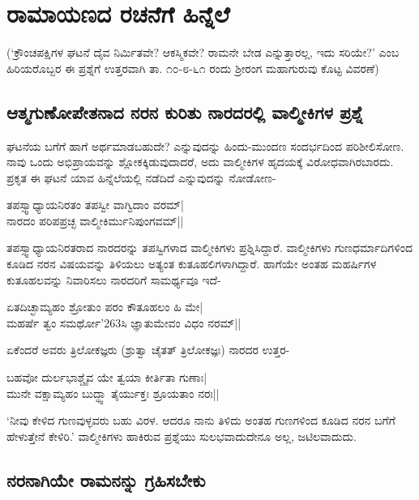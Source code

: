 \chapter{ರಾಮಾಯಣದ ರಚನೆಗೆ ಹಿನ್ನೆಲೆ} 

(`ಕ್ರೌಂಚಪಕ್ಷಿಗಳ ಘಟನೆ ದೈವ ನಿರ್ಮಿತವೇ? ಆಕಸ್ಮಿಕವೇ? ರಾಮನೇ ಬೇಡ ಎನ್ನುತ್ತಾರಲ್ಲ, ಇದು ಸರಿಯೇ?' ಎಂಬ ಹಿರಿಯರೊಬ್ಬರ ಈ ಪ್ರಶ್ನೆಗೆ ಉತ್ತರವಾಗಿ ತಾ. ೧೦-೮-೬೧ ರಂದು ಶ್ರೀರಂಗ ಮಹಾಗುರುವು ಕೊಟ್ಟ ವಿವರಣೆ) 

\section*{ಆತ್ಮಗುಣೋಪೇತನಾದ ನರನ ಕುರಿತು ನಾರದರಲ್ಲಿ ವಾಲ್ಮೀಕಿಗಳ ಪ್ರಶ್ನೆ} 

ಘಟನೆಯ ಬಗೆಗೆ ಹಾಗೆ ಅರ್ಥಮಾಡಬಹುದೇ? ಎನ್ನುವುದನ್ನು ಹಿಂದು-ಮುಂದಣ ಸಂದರ್ಭದಿಂದ ಪರಿಶೀಲಿಸೋಣ. ನಾವು ಒಂದು ಅಭಿಪ್ರಾಯವನ್ನು ಶ್ಲೋಕಕ್ಕಿಡುವುದಾದರೆ, ಅದು ವಾಲ್ಮೀಕಿಗಳ ಹೃದಯಕ್ಕೆ ವಿರೋಧವಾಗಿರಬಾರದು. ಪ್ರಕೃತ ಈ ಘಟನೆ ಯಾವ ಹಿನ್ನೆಲೆಯಲ್ಲಿ ನಡೆದಿದೆ ಎನ್ನುವುದನ್ನು ನೋಡೋಣ- 

\begin{shloka}
ತಪಸ್ಸ್ವಾಧ್ಯಾಯನಿರತಂ ತಪಸ್ವೀ ವಾಗ್ವಿದಾಂ ವರಮ್‍|\label{194}\\ 
ನಾರದಂ ಪರಿಪಪ್ರಚ್ಛ ವಾಲ್ಮೀಕಿರ್ಮುನಿಪುಂಗವಮ್‍||
\end{shloka}

ತಪಸ್ಸ್ವಾಧ್ಯಾಯನಿರತರಾದ ನಾರದರನ್ನು ತಪಸ್ವಿಗಳಾದ ವಾಲ್ಮೀಕಿಗಳು ಪ್ರಶ್ನಿಸಿದ್ದಾರೆ. ವಾಲ್ಮೀಕಿಗಳು ಗುಣಧರ್ಮಾದಿಗಳಿಂದ ಕೂಡಿದ ನರನ ವಿಷಯವನ್ನು ತಿಳಿಯಲು ಅತ್ಯಂತ ಕುತೂಹಲಿಗಳಾಗಿದ್ದಾರೆ. ಹಾಗೆಯೇ ಅಂತಹ ಮಹರ್ಷಿಗಳ ಕುತೂಹಲವನ್ನು ನಿವಾರಿಸಲು ನಾರದರಿಗೆ ಸಾಮರ್ಥ್ಯವೂ ಇದೆ- 

\begin{shloka} 
ಏತದಿಚ್ಛಾಮ್ಯಹಂ ಶ್ರೋತುಂ ಪರಂ ಕೌತೂಹಲಂ ಹಿ ಮೇ|\label{194d}\\ 
ಮಹರ್ಷೆ ತ್ವಂ ಸಮರ್ಥೋ\char'263ಸಿ ಜ್ಞಾತುಮೇವಂ ವಿಧಂ ನರಮ್‍||
\end{shloka}

ಏಕೆಂದರೆ ಅವರು ತ್ರಿಲೋಕಜ್ಞರು (ಶ್ರುತ್ವಾ ಚೈತತ್‍ ತ್ರಿಲೋಕಜ್ಞಃ)\label{194c} ನಾರದರ ಉತ್ತರ- 

\begin{shloka} 
ಬಹವೋ ದುರ್ಲಭಾಶ್ಚೈವ ಯೇ ತ್ವಯಾ ಕೀರ್ತಿತಾ ಗುಣಾಃ|\label{194a}\\ 
ಮುನೇ ವಕ್ಷಾಮ್ಯಹಂ ಬುದ್ಧ್ವಾ ತೈರ್ಯುಕ್ತಃ ಶ್ರೂಯತಾಂ ನರಃ|| 
\end{shloka}


`ನೀವು ಕೇಳಿದ ಗುಣವುಳ್ಳವರು ಬಹು ವಿರಳ. ಆದರೂ ನಾನು ತಿಳಿದು ಅಂತಹ ಗುಣಗಳಿಂದ ಕೂಡಿದ ನರನ ಬಗೆಗೆ ಹೇಳುತ್ತೇನೆ ಕೇಳಿರಿ.' ವಾಲ್ಮೀಕಿಗಳು ಹಾಕಿರುವ ಪ್ರಶ್ನೆಯು ಸುಲಭವಾದುದೇನೂ ಅಲ್ಲ, ಜಟಿಲವಾದುದು. 

\section*{ನರನಾಗಿಯೇ ರಾಮನನ್ನು ಗ್ರಹಿಸಬೇಕು} 


